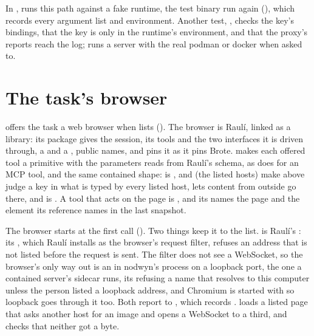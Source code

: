 \begin{sloppypar}
In ,
 runs this path against a fake
runtime, the test binary run again (), which
records every argument list and environment. Another test,
, checks the key's
bindings, that the key is only in the runtime's environment, and that the
proxy's reports reach the log;  runs a
server with the real podman or docker when asked to.
\end{sloppypar}

\section{The task's browser}

 offers the task a web browser when
 lists  (). The browser
is Raulí, linked as a library: its  package gives the
session, its tools and the two interfaces it is driven through, a
 and a , public names, and  pins it
as it pins Brote.  makes each offered tool a primitive
 with the parameters  reads from
Raulí's schema, as  does for an MCP tool, and the same
contained shape:  is , 
and  (the listed hosts) make  above
judge a key in what is typed by every listed host, 
lets content from outside go there, and  is
. A tool that acts on the page is ,
and its  names the page and the element its reference
names in the last snapshot.

The browser starts at the first call (). Two things keep it to
the list.  is Raulí's : its
, which Raulí installs as the browser's request filter,
refuses an address that is not listed before the request is sent. The
filter does not see a WebSocket, so the browser's only way out is an
 in nodwyn's process on a loopback port, the one a
contained server's sidecar runs, its  refusing a name that
resolves to this computer unless the person listed a loopback address,
and Chromium is started with 
so loopback goes through it too. Both report to ,
which records . 
loads a listed page that asks another host for an image and opens a
WebSocket to a third, and checks that neither got a byte.

